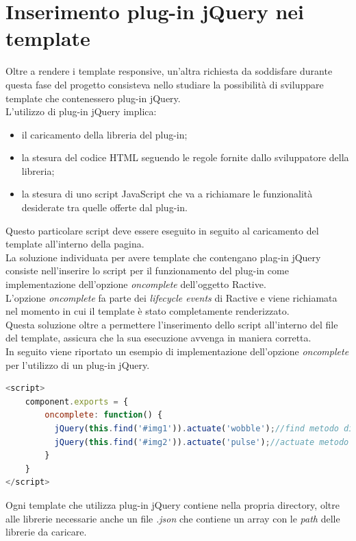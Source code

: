 \section{Inserimento plug-in jQuery nei template}
Oltre a rendere i template responsive, un'altra richiesta da soddisfare durante questa fase del progetto consisteva nello studiare la possibilità di sviluppare template che contenessero plug-in jQuery.\\
L'utilizzo di plug-in jQuery implica:
\begin{itemize}
	\item il caricamento della libreria del plug-in;
	\item la stesura del codice HTML seguendo le regole fornite dallo sviluppatore della libreria;
	\item la stesura di uno script JavaScript che va a richiamare le funzionalità desiderate tra quelle offerte dal plug-in.
\end{itemize}
Questo particolare script deve essere eseguito in seguito al caricamento del template all'interno della pagina.\\
La soluzione individuata per avere template che contengano plag-in jQuery consiste nell'inserire lo script per il funzionamento del plug-in come implementazione dell'opzione \textit{oncomplete} dell'oggetto Ractive.\\
L'opzione \textit{oncomplete} fa parte dei \textit{lifecycle events} di Ractive e viene richiamata nel momento in cui il template è stato completamente renderizzato.\\
Questa soluzione oltre a permettere l'inserimento dello script all'interno del file del template, assicura che la sua esecuzione avvenga in maniera corretta.\\
In seguito viene riportato un esempio di implementazione dell'opzione \textit{oncomplete} per l'utilizzo di un plug-in jQuery.
\begin{lstlisting}[language=JavaScript, caption= Implementazione dell'opzione \textit{oncomplete}]
<script>
	component.exports = {
		oncomplete: function() {
		  jQuery(this.find('#img1')).actuate('wobble');//find metodo di Ractive 
		  jQuery(this.find('#img2')).actuate('pulse');//actuate metodo plug-in
		}
	}
</script>
\end{lstlisting}
Ogni template che utilizza plug-in jQuery contiene nella propria directory, oltre alle librerie necessarie anche un file \textit{.json} che contiene un array con le \textit{path} delle librerie da caricare.

